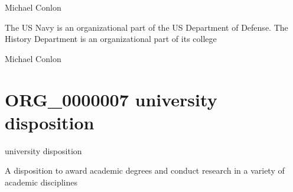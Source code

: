 \documentclass[letterpaper,10pt,english]{sphinxmanual}
\begin{document}
\begin{sphinxShadowBox}

\sphinxAtStartPar
Michael Conlon 
\end{sphinxShadowBox}

\begin{sphinxShadowBox}

\sphinxAtStartPar
The US Navy is an organizational part of the US Department of Defense.  The History Department is an organizational part of its college
\end{sphinxShadowBox}

\begin{sphinxShadowBox}

\sphinxAtStartPar
Michael Conlon 
\end{sphinxShadowBox}
\begin{quote}
\label{\detokenize{doc-ORG_0000007:org-0000007}}\label{\detokenize{doc-ORG_0000007:university-disposition}}\label{\detokenize{doc-ORG_0000007:org-0000007}}
\ignorespaces \end{quote}


\section{ORG\_0000007 \sphinxhyphen{} university disposition}
\label{\detokenize{doc-ORG_0000007:org-0000007-university-disposition}}\label{\detokenize{doc-ORG_0000007:index-0}}\label{\detokenize{doc-ORG_0000007::doc}}
\begin{sphinxShadowBox}

\sphinxAtStartPar
university disposition
\end{sphinxShadowBox}

\begin{sphinxShadowBox}

\sphinxAtStartPar
A disposition to award academic degrees and conduct research in a variety of academic disciplines
\end{sphinxShadowBox}

\begin{sphinxShadowBox}

\sphinxAtStartPar
{}
\end{sphinxShadowBox}
\end{document}
